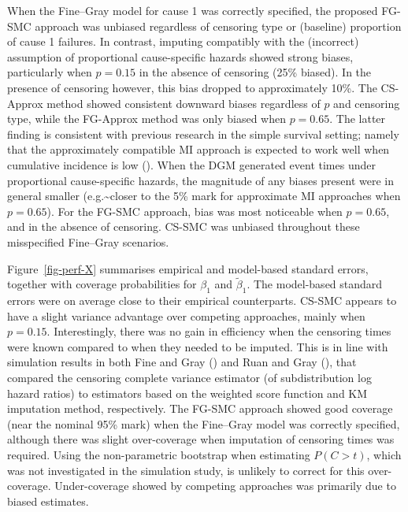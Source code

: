 \documentclass[
  letterpaper,
  DIV=11,
  numbers=noendperiod]{scrreprt}
\begin{document}
When the Fine--Gray model for cause 1 was correctly specified, the
proposed FG-SMC approach was unbiased regardless of censoring type or
(baseline) proportion of cause 1 failures. In contrast, imputing
compatibly with the (incorrect) assumption of proportional
cause-specific hazards showed strong biases, particularly when
\(p = 0.15\) in the absence of censoring (25\% biased). In the presence
of censoring however, this bias dropped to approximately 10\%. The
CS-Approx method showed consistent downward biases regardless of \(p\)
and censoring type, while the FG-Approx method was only biased when
\(p = 0.65\). The latter finding is consistent with previous research in
the simple survival setting; namely that the approximately compatible MI
approach is expected to work well when cumulative incidence is low
(). When the DGM generated event times under proportional
cause-specific hazards, the magnitude of any biases present were in
general smaller (e.g.\textasciitilde closer to the 5\% mark for
approximate MI approaches when \(p = 0.65\)). For the FG-SMC approach,
bias was most noticeable when \(p = 0.65\), and in the absence of
censoring. CS-SMC was unbiased throughout these misspecified Fine--Gray
scenarios.

Figure~\ref{fig-perf-X} summarises empirical and model-based standard
errors, together with coverage probabilities for \(\beta_1\) and
\(\tilde{\beta}_1\). The model-based standard errors were on average
close to their empirical counterparts. CS-SMC appears to have a slight
variance advantage over competing approaches, mainly when \(p = 0.15\).
Interestingly, there was no gain in efficiency when the censoring times
were known compared to when they needed to be imputed. This is in line
with simulation results in both Fine and Gray
() and Ruan and
Gray (), that
compared the censoring complete variance estimator (of subdistribution
log hazard ratios) to estimators based on the weighted score function
and KM imputation method, respectively. The FG-SMC approach showed good
coverage (near the nominal 95\% mark) when the Fine--Gray model was
correctly specified, although there was slight over-coverage when
imputation of censoring times was required. Using the non-parametric
bootstrap when estimating \(P(C > t)\), which was not investigated in
the simulation study, is unlikely to correct for this over-coverage.
Under-coverage showed by competing approaches was primarily due to
biased estimates.
\end{document}

